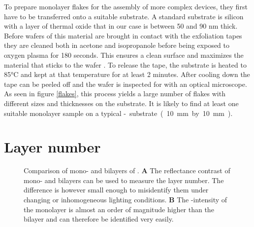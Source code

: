 To prepare monolayer flakes for the assembly of more complex devices, they first have to be transferred onto a suitable substrate. A standard substrate is silicon with a layer of thermal oxide that in our case is between 50 and 90 nm thick. Before wafers of this material are brought in contact with the exfoliation tapes they are cleaned both in acetone and isopropanole before being exposed to oxygen plasma for 180 seconds. This ensures a clean surface and maximizes the material that sticks to the wafer \cite{pizzocchero_hot_2016}. To release the tape, the substrate is heated to 85°C and kept at that temperature for at least 2 minutes. After cooling down the tape can be peeled off and the wafer is inspected for with an optical microscope. As seen in figure \ref{flakes}, this process yields a large number of flakes with different sizes and thicknesses on the substrate. It is likely to find at least one suitable monolayer sample on a typical \si-substrate (10 mm by 10 mm). 

\section{Layer number}

\begin{figure}
	\centering
	\begin{subfigure}{0.4\textwidth}
	\caption{}
	\end{subfigure}
	\begin{subfigure}{0.4\textwidth}
	\caption{}
	\end{subfigure}
	\caption{Comparison of mono- and bilayers of \wse\!. \textbf{A} The reflectance contrast of mono- and bilayers can be used to measure the layer number. The difference is however small enough to misidentify them under changing or inhomogeneous lighting conditions. \textbf{B} The \pl-intensity of the monolayer is almost an order of magnitude higher than the bilayer and can therefore be identified very easily.}
	\label{pl-contrast}
\end{figure}

